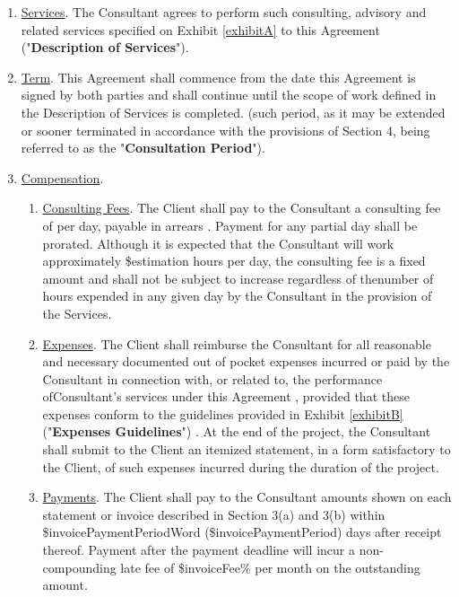 \documentclass[12pt]{article}
\begin{document}
\begin{enumerate}
    \item \underline{Services}.  The Consultant agrees to perform such consulting, advisory and related services specified on Exhibit \ref{exhibitA}
 to this Agreement ("{\bf Description of Services}").
    \item \underline{Term}.  This Agreement shall commence from the date this Agreement is signed by both parties and shall continue until the scope of work defined in the Description of Services is completed. (such period, as it may be extended or sooner terminated in accordance with the provisions of Section 4, being referred to as the "{\bf Consultation Period}").
    \item \underline{Compensation}.
    \begin{enumerate}
        \item \underline{Consulting Fees}.
                    The Client shall pay to the Consultant a consulting fee of  per day, payable in arrears
            . Payment for any partial day  shall be prorated.
                            Although it is expected that the Consultant will work approximately \${estimation} hours per day, the consulting fee is a fixed amount and shall not be subject to increase regardless of thenumber of hours expended in any given day by the Consultant in the provision of the Services.
                            \item \underline{Expenses}.
                    The Client shall reimburse the Consultant for all reasonable and necessary documented out of pocket expenses incurred or paid by the Consultant in connection with, or related to, the performance ofConsultant's services under this Agreement\ignorespaces
                            , provided that these expenses conform to the guidelines provided in Exhibit \ref{exhibitB}
 ("{\bf Expenses Guidelines}")\ignorespaces
            .
                                        At the end of the project, the Consultant shall submit to the Client an itemized statement, in a form satisfactory to the Client, of such expenses incurred during the duration of the project.
                            \item \underline{Payments}. The Client shall pay to the Consultant amounts shown on each statement or invoice described in Section 3(a) and 3(b) within \${invoicePaymentPeriodWord} (\${invoicePaymentPeriod}) days after receipt thereof. Payment after the payment deadline will incur a non-compounding late fee of \${invoiceFee}\% per month on the outstanding amount.

\end{enumerate}
\end{enumerate}
\end{document}
